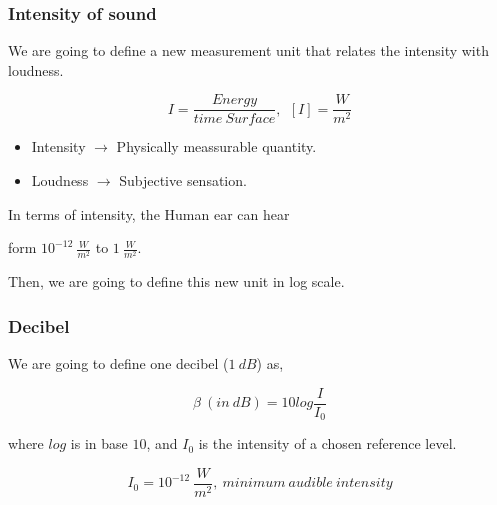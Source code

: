 \documentclass[]{beamer}
\begin{document}
\begin{frame}
\frametitle{Intensity of sound}


We are going  to define a new measurement unit that relates the intensity with loudness.
\vspace{3mm}
\pause

\begin{equation*}
I=\frac{Energy}{time~Surface}, \ \ [I]=\frac{W}{m^2}
\end{equation*}


\begin{itemize}
\item Intensity $\rightarrow$ Physically meassurable quantity.
\pause

\item Loudness $\rightarrow$ Subjective sensation. 
\end{itemize}
\pause
\vspace{3mm}

In terms of intensity, the Human ear can hear  
\vspace{3mm}
\pause

form $10^{-12}~\frac{W}{m^2}$ to $1~\frac{W}{m^2}$.

\vspace{3mm}
\pause
Then, we are going to define this new unit  in log scale.

  \end{frame}








\begin{frame}
\frametitle{Decibel}

We are going to define one decibel ($1~dB$) as,
\pause

\begin{equation}
\beta~ (in ~dB)=10 log\frac{I}{I_0}
\end{equation}

\pause

where $log$ is in base $10$, and $I_0$ is the intensity of a chosen reference level.
\pause

\begin{equation}
I_0=10^{-12}~\frac{W}{m^2}, \ minimum~audible~intensity
\end{equation}

  \end{frame}
\end{document}
